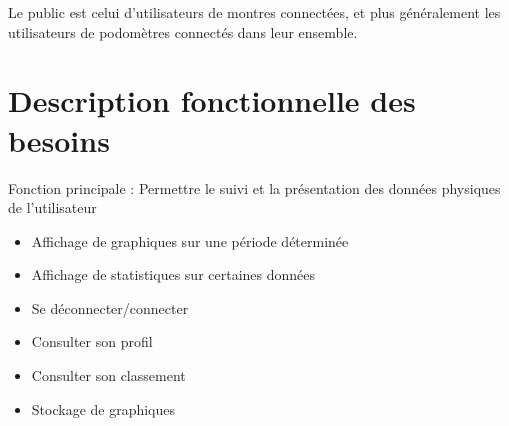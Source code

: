 \documentclass{article}
\newcommand\tab[1][1cm]{\hspace*{#1}}
\begin{document}
\tab Le public est celui d'utilisateurs de montres connectées, et plus généralement les utilisateurs de podomètres connectés dans leur ensemble. 

\section{Description fonctionnelle des besoins}

Fonction principale : Permettre le suivi et la présentation des données physiques de l'utilisateur

\begin{itemize}
  \item Affichage de graphiques sur une période déterminée
  \item Affichage de statistiques sur certaines données
  \item Se déconnecter/connecter
  \item Consulter son profil
  \item Consulter son classement
  \item Stockage de graphiques
\end{itemize}
\end{document}
